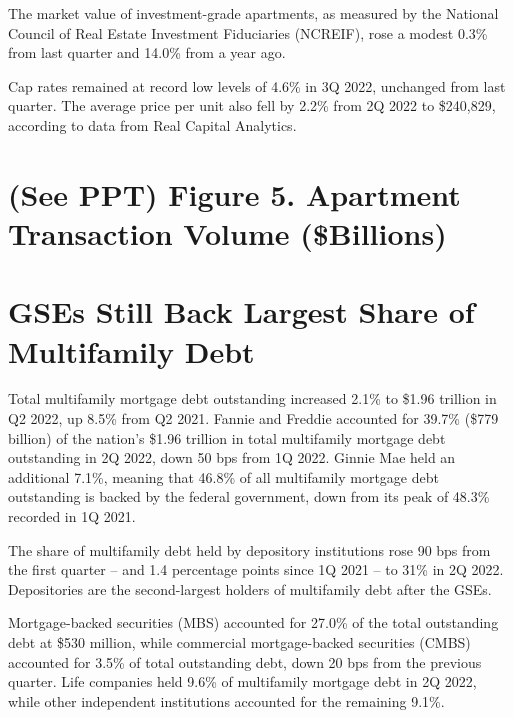 \documentclass{article}
\begin{document}
\medskip

\noindent The market value of investment-grade apartments, as measured by the National Council of Real Estate Investment Fiduciaries (NCREIF), rose a modest 0.3\% from last quarter and 14.0\% from a year ago. 

\medskip

\noindent Cap rates remained at record low levels of 4.6\% in 3Q 2022, unchanged from last quarter. The average price per unit also fell by 2.2\% from 2Q 2022 to \$240,829, according to data from Real Capital Analytics. 

\bigskip

\section*{\normalsize (See PPT) Figure 5. Apartment Transaction Volume (\$Billions)}

\bigskip

\section*{\normalsize GSEs Still Back Largest Share of Multifamily Debt}

Total multifamily mortgage debt outstanding increased 2.1\% to \$1.96 trillion in Q2 2022, up 8.5\% from Q2 2021. Fannie and Freddie accounted for 39.7\% (\$779 billion) of the nation’s \$1.96 trillion in total multifamily mortgage debt outstanding in 2Q 2022, down 50 bps from 1Q 2022. Ginnie Mae held an additional 7.1\%, meaning that 46.8\% of all multifamily mortgage debt outstanding is backed by the federal government, down from its peak of 48.3\% recorded in 1Q 2021.

\medskip

\noindent The share of multifamily debt held by depository institutions rose 90 bps from the first quarter – and 1.4 percentage points since 1Q 2021 – to 31\% in 2Q 2022. Depositories are the second-largest holders of multifamily debt after the GSEs.

\medskip

\noindent Mortgage-backed securities (MBS) accounted for 27.0\% of the total outstanding debt at \$530 million, while commercial mortgage-backed securities (CMBS) accounted for 3.5\% of total outstanding debt, down 20 bps from the previous quarter. 
Life companies held 9.6\% of multifamily mortgage debt in 2Q 2022, while other independent institutions accounted for the remaining 9.1\%.  
\end{document}
